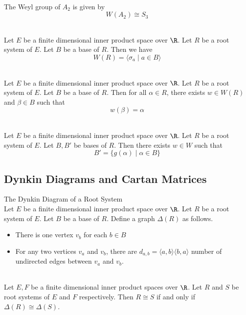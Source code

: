 \documentclass[a4paper]{article}
\begin{document}
\begin{eg}{}{} \\The Weyl group of $A_2$ is given by $$W(A_2)\cong S_3$$
\end{eg}

\begin{prp}{}{} \\Let $E$ be a finite dimensional inner product space over $\R$. Let $R$ be a root system of $E$. Let $B$ be a base of $R$. Then we have $$W(R)=\langle\sigma_a\;|\;a\in B\rangle$$
\end{prp}

\begin{lmm}{}{} \\Let $E$ be a finite dimensional inner product space over $\R$. Let $R$ be a root system of $E$. Let $B$ be a base of $R$. Then for all $\alpha\in R$, there exists $w\in W(R)$ and $\beta\in B$ such that $$w(\beta)=\alpha$$
\end{lmm}

\begin{prp}{}{} \\Let $E$ be a finite dimensional inner product space over $\R$. Let $R$ be a root system of $E$. Let $B,B'$ be bases of $R$. Then there exists $w\in W$ such that $$B'=\{g(\alpha)\;|\;\alpha\in B\}$$
\end{prp}

\subsection{Dynkin Diagrams and Cartan Matrices}
\begin{defn}{The Dynkin Diagram of a Root System}{} \\Let $E$ be a finite dimensional inner product space over $\R$. Let $R$ be a root system of $E$. Let $B$ be a base of $R$. Define a graph $\Delta(R)$ as follows. 
\begin{itemize}
\item There is one vertex $v_b$ for each $b\in B$
\item For any two vertices $v_a$ and $v_b$, there are $d_{a,b}=\langle a,b\rangle\langle b,a\rangle$ number of undirected edges between $v_a$ and $v_b$. 
\end{itemize}
\end{defn}

\begin{prp}{}{} \\Let $E,F$ be a finite dimensional inner product spaces over $\R$. Let $R$ and $S$ be root systems of $E$ and $F$ respectively. Then $R\cong S$ if and only if $\Delta(R)\cong\Delta(S)$. 
\end{prp}
\end{document}
